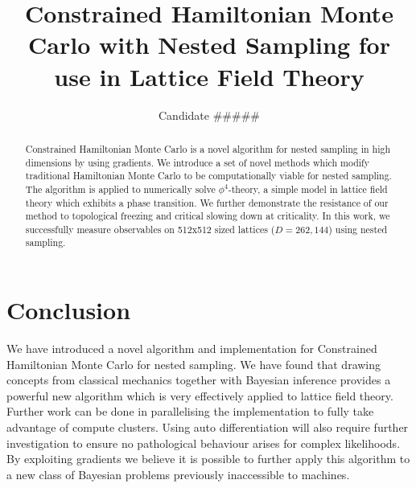 \documentclass[aps,prd,reprint,preprintnumbers,showpacs,floatfix,nofootinbib,superscript address]{revtex4-2}
\begin{document}
\title{Constrained Hamiltonian Monte Carlo with Nested Sampling for use in Lattice Field Theory}

\author{Candidate \#\#\#\#\#}

\begin{abstract}
     Constrained Hamiltonian Monte Carlo is a novel algorithm for nested sampling in high dimensions by using gradients.
     We introduce a set of novel methods which modify traditional Hamiltonian Monte Carlo to be computationally viable for
     nested sampling.
     The algorithm is applied to numerically solve $\phi^4$-theory, a simple model in lattice field theory which
     exhibits a phase transition.
     We further demonstrate the resistance of our method to topological freezing and critical slowing down at criticality.
     In this work, we successfully measure observables on 512x512 sized lattices ($D=262,144$) using nested sampling.
\end{abstract}


\maketitle

















\section{Conclusion}\label{sec:conclusion}
     We have introduced a novel algorithm and implementation for Constrained Hamiltonian Monte Carlo for nested sampling.
     We have found that drawing concepts from classical mechanics together with Bayesian inference provides a powerful
     new algorithm which is very effectively applied to lattice field theory.
     Further work can be done in parallelising the implementation to fully take advantage of compute clusters.
     Using auto differentiation will also require further investigation to ensure no pathological behaviour arises for
     complex likelihoods.
     By exploiting gradients we believe it is possible to further apply this algorithm to a new class of
     Bayesian problems previously inaccessible to machines.






\end{document}
